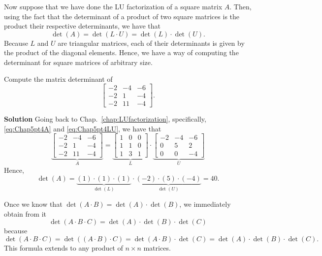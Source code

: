 \vspace*{.2cm}
\begin{tcolorbox}[sharp corners, colback=green!30, colframe=green!80!blue, title=\textbf{\Large Matrix Determinant via LU Factorization}]
Now suppose that we have done the LU factorization of a square matrix $A$. Then, 
using the fact that the determinant of a product of two square matrices is the product their respective determinants, we have that 
$$\det(A) = \det(L \cdot U) = \det(L) \cdot \det(U). $$
Because $L$ and $U$ are triangular matrices, each of their determinants is given by the product of the diagonal elements. Hence, we have a way of computing the determinant for square matrices of arbitrary size.
\end{tcolorbox}

\vspace*{.2cm}
\begin{example} Compute the matrix determinant of
$$\left[\begin{array}{rrr} -2 & -4 & -6\\
-2 & 1 & -4 \\ -2 & 11 & -4 \end{array}\right].$$

\end{example} 

\textbf{Solution}
Going back to Chap.~\ref{chap:LUfactorization}, specifically, \eqref{eq:Chap5pt4A} and \eqref{eq:Chap5pt4LU}, we have that
$$ \underbrace{\left[\begin{array}{rrr} -2 & -4 & -6\\
-2 & 1 & -4 \\ -2 & 11 & -4 \end{array}\right]}_{A}  =
 \underbrace{\left[\begin{array}{rrr} 1 & 0 & 0\\ 1 & 1 & 0\\ 1 & 3 & 1\end{array} \right]}_{L} \cdot  \underbrace{\left[\begin{array}{rrr} -2 & -4 & -6 \\ 0 & 5 &  2 \\ 0 &  0 & -4\end{array} \right]}_{U} $$
Hence, 
$$\det(A) = \underbrace{(1)\cdot(1) \cdot(1)}_{\det(L)} \cdot \underbrace{(-2)\cdot(5)\cdot(-4)}_{\det(U)} = 40.$$
\Qed
\vspace*{0.2cm}
\begin{tcolorbox}
Once we know that $\det(A \cdot B) = \det(A) \cdot \det(B)$, we immediately obtain from it
$$\boxed{\det(A \cdot B \cdot C) = \det(A) \cdot \det(B) \cdot \det(C)}$$
because $\det(A \cdot B \cdot C) = \det((A \cdot B) \cdot C)= \det(A \cdot B) \cdot \det(C) = \det(A) \cdot \det(B) \cdot \det(C).$
This formula extends to any product of $n \times n$ matrices.
\end{tcolorbox}

